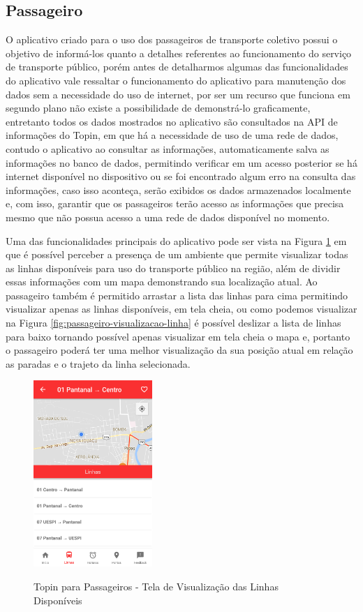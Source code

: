 {{{{{{{\subsection{Passageiro}

O aplicativo criado para o uso dos passageiros de transporte coletivo possui o objetivo de informá-los quanto a detalhes referentes ao funcionamento do serviço de transporte público, porém antes de detalharmos algumas das funcionalidades do aplicativo vale ressaltar o funcionamento do aplicativo para manutenção dos dados sem a necessidade do uso de internet, por ser um recurso que funciona em segundo plano não existe a possibilidade de demonstrá-lo graficamente, entretanto todos os dados mostrados no aplicativo são consultados na API de informações do Topin, em que há a necessidade de uso de uma rede de dados, contudo o aplicativo ao consultar as informações, automaticamente salva as informações no banco de dados, permitindo verificar em um acesso posterior se há  internet disponível no dispositivo ou se foi encontrado algum erro na consulta das informações, caso isso aconteça, serão exibidos os dados armazenados localmente e, com isso, garantir que os passageiros terão acesso as informações que precisa mesmo que não possua acesso a uma rede de dados disponível no momento.

Uma das funcionalidades principais do aplicativo pode ser vista na Figura \ref{fig:passageiro-linhas-disponiveis} em que é possível perceber a presença de um ambiente que permite visualizar todas as linhas disponíveis para uso do transporte público na região, além de dividir essas informações com um mapa demonstrando sua localização atual. Ao passageiro também é permitido arrastar a lista das linhas para cima permitindo visualizar apenas as linhas disponíveis, em tela cheia, ou como podemos visualizar na Figura \ref{fig:passageiro-visualizacao-linha} é possível deslizar a lista de linhas para baixo tornando possível apenas visualizar em tela cheia o mapa e, portanto o passageiro poderá ter uma melhor visualização da sua posição atual em relação as paradas e o trajeto da linha selecionada.

\begin{figure}[t]
\caption{Topin para Passageiros - Tela de Visualização das Linhas Disponíveis}
\centering
\includegraphics[width=0.4\textwidth]{imagens/linhas-disponiveis.png}
\label{fig:passageiro-linhas-disponiveis}
\end{figure}

}}}}}}}
